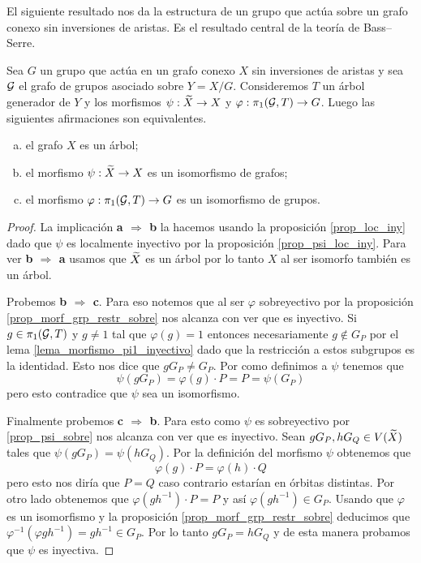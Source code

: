 \documentclass[tesis.tex]{subfiles}
\begin{document}
El siguiente resultado nos da la estructura de un grupo que actúa sobre un grafo conexo sin inversiones de aristas. 
Es el resultado central de la teoría de Bass--Serre.

\begin{teo}\label{teo_Serre}
	Sea $G$ un grupo que actúa en un grafo conexo $X$ sin inversiones de aristas y sea ${\cal G}$ el grafo de grupos asociado sobre $Y = X / G$.
	Consideremos $T$ un árbol generador de $Y$ y los morfismos $\psi: \widetilde X \to X$ y $\varphi: \pi_1({\cal G}, T) \to G$.
	Luego las siguientes afirmaciones son equivalentes.
	\begin{enumerate}[(a)]
		\item el grafo $X$ es un árbol;
		\item el morfismo $\psi: \widetilde X \to X$ es un isomorfismo de grafos;
		\item el morfismo $\varphi:\pi_1({\cal G}, T) \to G$ es un isomorfismo de grupos.
	\end{enumerate}
\end{teo}

\begin{proof}	
		 La implicación \textbf{a $\Rightarrow$ b} la hacemos usando la proposición \ref{prop_loc_iny} dado que $\psi$ es localmente inyectivo por la proposición \ref{prop_psi_loc_iny}.
		 Para ver \textbf{b $\Rightarrow$ a} usamos que $\widetilde X$ es un árbol por lo tanto $X$ al ser isomorfo también es un árbol.
		 
		 Probemos \textbf{b $\Rightarrow$ c}. 
		 Para eso notemos que al ser $\varphi$ sobreyectivo por la proposición \ref{prop_morf_grp_restr_sobre} nos alcanza con ver que es inyectivo.
		 Si $g \in \pi_1({\cal G}, T)$ y $g \neq 1$ tal que $\varphi(g)= 1$ entonces necesariamente $g \notin G_P$ por el lema \ref{lema_morfismo_pi1_inyectivo} dado que la restricción a estos subgrupos es la identidad.
		 Esto nos dice que $g G_P \neq G_P $.
		 Por como definimos a $\psi$ tenemos que 
		 \[
		 \psi (gG_P ) = \varphi(g) \cdot P  = P = \psi(G_P )
		 \] 
		 pero esto contradice que $\psi$ sea un isomorfismo.
		 
		 
		 Finalmente probemos \textbf{c $\Rightarrow$ b}. 
		 Para esto como $\psi$ es sobreyectivo por \ref{prop_psi_sobre} nos alcanza con ver que es inyectivo.
		 Sean $gG_P, hG_Q \in V(\widetilde X)$ tales que $\psi(gG_P) = \psi(hG_Q)$.
		 Por la definición del morfismo $\psi$ obtenemos que 
		 \[
		 \varphi(g)\cdot P = \varphi(h)\cdot Q
		 \]
		 pero esto nos diría que $P = Q$ caso contrario estarían en órbitas distintas. 
		 Por otro lado obtenemos que $\varphi(g h^{-1}) \cdot P  =  P$ y así $\varphi(gh^{-1}) \in G_P$. 
		 Usando que $\varphi$ es un isomorfismo y la proposición \ref{prop_morf_grp_restr_sobre} deducimos que $\varphi^{-1} (\varphi gh^{-1}) = gh^{-1} \in G_P$.
		 Por lo tanto $gG_P  = hG_Q$ y de esta manera probamos que $\psi$ es inyectiva.
\end{proof}
\end{document}
